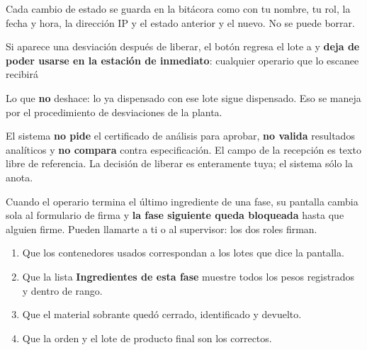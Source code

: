 \begin{cajaInfo}
Cada cambio de estado se guarda en la bitácora como  con tu
nombre, tu rol, la fecha y hora, la dirección IP y el estado anterior y el nuevo.
No se puede borrar.
\end{cajaInfo}

\newpage
{}

Si aparece una desviación después de liberar, el botón  regresa el lote
a \cuarentena{} y \textbf{deja de poder usarse en la estación de inmediato}: cualquier
operario que lo escanee recibirá 

Lo que \textbf{no} deshace: lo ya dispensado con ese lote sigue dispensado. Eso se
maneja por el procedimiento de desviaciones de la planta.


\begin{cajaOjo}
El sistema \textbf{no pide} el certificado de análisis para aprobar, \textbf{no valida}
resultados analíticos y \textbf{no compara} contra especificación. El campo
 de la recepción es texto libre de referencia.
La decisión de liberar es enteramente tuya; el sistema sólo la anota.
\end{cajaOjo}

\newpage
{}


Cuando el operario termina el último ingrediente de una fase, su pantalla cambia sola
al formulario de firma y \textbf{la fase siguiente queda bloqueada} hasta que alguien
firme. Pueden llamarte a ti o al supervisor: los dos roles firman.



\begin{enumerate}
    \item Que los contenedores usados correspondan a los lotes que dice la pantalla.
    \item Que la lista \textbf{Ingredientes de esta fase} muestre todos los pesos
          registrados y dentro de rango.
    \item Que el material sobrante quedó cerrado, identificado y devuelto.
    \item Que la orden y el lote de producto final son los correctos.
\end{enumerate}

